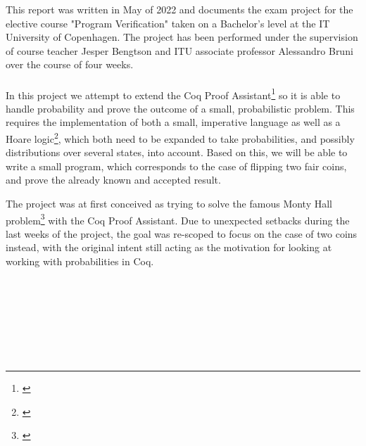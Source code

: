 This report was written in May of 2022 and documents the exam project for the elective course "Program Verification" taken on a Bachelor's level at the IT University of Copenhagen. The project has been performed under the supervision of course teacher Jesper Bengtson and ITU associate professor Alessandro Bruni over the course of four weeks. 
\\
\\
In this project we attempt to extend the Coq Proof Assistant\footnote{\textcite{CoqIntro}} so it is able to handle probability and prove the outcome of a small, probabilistic problem. This requires the implementation of both a small, imperative language as well as a Hoare logic\footnote{\textcite{SF2}}, which both need to be expanded to take probabilities, and possibly distributions over several states, into account. Based on this, we will be able to write a small program, which corresponds to the case of flipping two fair coins, and prove the already known and accepted result. 

The project was at first conceived as trying to solve the famous Monty Hall problem\footnote{\textcite{MontyHallWiki}} with the Coq Proof Assistant. Due to unexpected setbacks during the last weeks of the project, the goal was re-scoped to focus on the case of two coins instead, with the original intent still acting as the motivation for looking at working with probabilities in Coq. 

\\
\\
\\
\\
\\
\\















